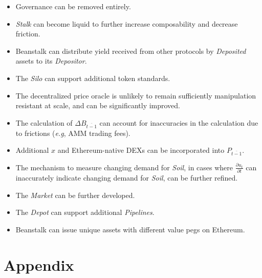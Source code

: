 \documentclass[tikz]{article}
\newcommand{\term}[1]{\textsl{#1}}
\begin{document}
\begin{itemize}
    \item Governance can be removed entirely.
    \item \term{Stalk} can become liquid to further increase composability and decrease friction. 
    \item Beanstalk can distribute yield received from other protocols by \term{Deposited} assets to its \term{Depositor}.
    \item The \term{Silo} can support additional token standards.
    \item The decentralized price oracle is unlikely to remain sufficiently manipulation resistant at scale, and can be significantly improved. 
    \item The calculation of \hyperlink{ht50}{$\Delta B_{\overline{t-1}}$} can account for inaccuracies in the calculation due to frictions (\term{e.g}, AMM trading fees).
    \item Additional \hyperlink{ht223}{$x$} and Ethereum-native DEXs can be incorporated into \hyperlink{ht139}{$P_{\overline{t-1}}$}.
    \item The mechanism to measure changing demand for \term{Soil}, in cases where \hyperlink{ht63}{$\frac{\partial u_t}{\partial t}$} can inaccurately indicate changing demand for \term{Soil}, can be further refined.
    \item The \term{Market} can be further developed.
    \item The \term{Depot} can support additional \term{Pipelines}.
    \item Beanstalk can issue unique assets with different value pegs on Ethereum.
\end{itemize}

\newpage
\section{Appendix}

\newpage

\newpage

\newpage

\newpage

\newpage

\newpage

\newpage

\newpage

\newpage

\newpage

\newpage
\end{document}
